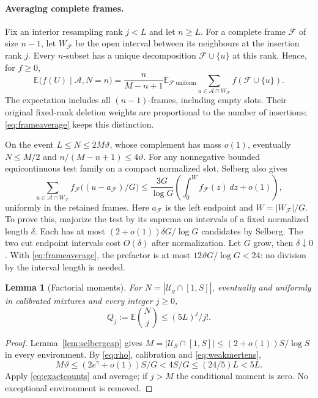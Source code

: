 \documentclass[11pt,a4paper]{article}
\newtheorem{lemma}[theorem]{Lemma}
\newcommand{\E}{\mathbb E}
\begin{document}
\paragraph{Averaging complete frames.}
Fix an interior resampling rank $j<L$ and let $n\ge L$. For a complete frame
$\mathcal F$ of size $n-1$, let $W_{\mathcal F}$ be the open interval
between its neighbours at the insertion rank $j$. Every $n$-subset has a unique
decomposition $\mathcal F\cup\{u\}$ at this rank. Hence, for $f\ge0$,
\begin{equation}\label{eq:frameaverage}
 \E\bigl(f(U)\mid\mathcal A,N=n\bigr)
 =\frac{n}{M-n+1}
   \E_{\mathcal F\ \mathrm{uniform}}
      \sum_{u\in\mathcal A\cap W_{\mathcal F}}
                       f(\mathcal F\cup\{u\}).
\end{equation}
The expectation includes all $(n-1)$-frames, including empty slots.
Their original fixed-rank deletion weights are proportional to the
number of insertions; \eqref{eq:frameaverage} keeps this distinction.

On the event $L\le N\le2M\vartheta$, whose complement has mass
$o(1)$, eventually $N\le M/2$ and
$n/(M-n+1)\le4\vartheta$. For any nonnegative bounded equicontinuous
test family on a compact normalized slot, Selberg also gives
\begin{equation}\label{eq:positiveinsertion}
 \sum_{u\in\mathcal A\cap W_{\mathcal F}}
             f_{\mathcal F}\bigl((u-a_{\mathcal F})/G\bigr)
 \le \frac{3G}{\log G}
       \left(\int_0^{W}f_{\mathcal F}(z)\,dz+o(1)\right),
\end{equation}
uniformly in the retained frames. Here $a_{\mathcal F}$ is the left
endpoint and $W=|W_{\mathcal F}|/G$.
To prove this, majorize the test by its suprema on intervals of
a fixed normalized length $\delta$. Each has at most
$(2+o(1))\delta G/\log G$ candidates by Selberg.
The two cut endpoint intervals cost $O(\delta)$ after normalization.
Let $G$ grow, then $\delta\downarrow0$.
With \eqref{eq:frameaverage}, the prefactor is at most
$12\vartheta G/\log G<24$: no division by the interval length is needed.

\begin{lemma}[Factorial moments]\label{lem:moments}
For $N=|\mathcal U_y\cap[1,S]|$, eventually and uniformly in
calibrated mixtures and every integer $j\ge0$,
\[
                       Q_j:=\E\binom Nj\le(5L)^j/j!.
\]
\end{lemma}
\begin{proof}
Lemma~\ref{lem:selbergcap} gives $M=|\mathcal U_S\cap[1,S]|
\le(2+o(1))S/\log S$ in every environment.
By \eqref{eq:rho}, calibration and \eqref{eq:weakmertens},
\[
 M\vartheta\le(2e^\gamma+o(1))S/G
                       <4S/G\le(24/5)L<5L.
\]
Apply \eqref{eq:exactcounts} and average; if $j>M$ the conditional
moment is zero. No exceptional environment is removed.
\end{proof}
\end{document}
